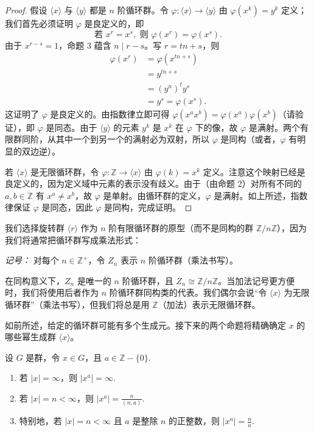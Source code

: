 \begin{proof}
假设 \(\langle x \rangle\) 与 \(\langle y \rangle\) 都是 \(n\) 阶循环群。令 \(\varphi : \langle x \rangle \to \langle y \rangle\) 由 \(\varphi(x^k) = y^k\) 定义；我们首先必须证明 \(\varphi\) 是良定义的，即
\[
\text{若 } x^r = x^s,\text{ 则 } \varphi(x^r) = \varphi(x^s).
\]
由于 \(x^{r-s} = 1\)，命题 3 蕴含 \(n \mid r-s\)。写 \(r = tn + s\)，则
\[
\begin{aligned}
\varphi(x^r) &= \varphi(x^{tn+s}) \\
&= y^{tn+s} \\
&= (y^n)^t y^s \\
&= y^s = \varphi(x^s).
\end{aligned}
\]
这证明了 \(\varphi\) 是良定义的。由指数律立即可得 \(\varphi(x^a x^b) = \varphi(x^a)\varphi(x^b)\)（请验证），即 \(\varphi\) 是同态。由于 \(\langle y \rangle\) 的元素 \(y^k\) 是 \(x^k\) 在 \(\varphi\) 下的像，故 \(\varphi\) 是满射。两个有限群同阶，从其中一个到另一个的满射必为双射，所以 \(\varphi\) 是同构（或者，\(\varphi\) 有明显的双边逆）。

若 \(\langle x \rangle\) 是无限循环群，令 \(\varphi : \mathbb{Z} \to \langle x \rangle\) 由 \(\varphi(k) = x^k\) 定义。注意这个映射已经是良定义的，因为定义域中元素的表示没有歧义。由于（由命题 2）对所有不同的 \(a, b \in \mathbb{Z}\) 有 \(x^a \neq x^b\)，故 \(\varphi\) 是单射。由循环群的定义，\(\varphi\) 是满射。如上所述，指数律保证 \(\varphi\) 是同态，因此 \(\varphi\) 是同构，完成证明。
\end{proof}

我们选择旋转群 \(\langle r \rangle\) 作为 \(n\) 阶有限循环群的原型（而不是同构的群 \(\mathbb{Z}/n\mathbb{Z}\)），因为我们将通常把循环群写成乘法形式：

\textit{记号：} 对每个 \(n \in \mathbb{Z}^+\)，令 \(Z_n\) 表示 \(n\) 阶循环群（乘法书写）。

在同构意义下，\(Z_n\) 是唯一的 \(n\) 阶循环群，且 \(Z_n \cong \mathbb{Z}/n\mathbb{Z}\)。当加法记号更方便时，我们将使用后者作为 \(n\) 阶循环群同构类的代表。我们偶尔会说“令 \(\langle x \rangle\) 为无限循环群”（乘法书写），但我们将总是用 \(\mathbb{Z}\)（加法）表示无限循环群。

如前所述，给定的循环群可能有多个生成元。接下来的两个命题将精确确定 \(x\) 的哪些幂生成群 \(\langle x \rangle\)。

\begin{proposition}
设 \(G\) 是群，令 \(x \in G\)，且 \(a \in \mathbb{Z} - \{0\}\).
\begin{enumerate}[label=(\arabic*)]
\item 若 \(|x| = \infty\)，则 \(|x^a| = \infty\).
\item 若 \(|x| = n < \infty\)，则 \(|x^a| = \frac{n}{(n, a)}\).
\item 特别地，若 \(|x| = n < \infty\) 且 \(a\) 是整除 \(n\) 的正整数，则 \(|x^a| = \frac{n}{a}\).
\end{enumerate}
\end{proposition}


